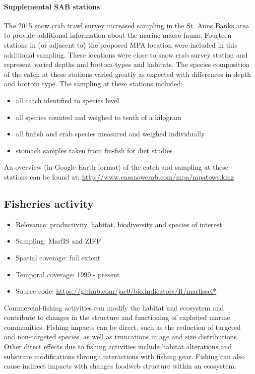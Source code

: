 \documentclass[letterpaper,portrait,11pt]{scrartcl}
\numberwithin{equation}{section}		%
\numberwithin{figure}{section}		%
\numberwithin{table}{section}				%
\begin{document}
\paragraph{Supplemental SAB stations}

The 2015 snow crab trawl survey increased sampling in the St. Anns Banks area to provide additional information about the marine macro-fauna. Fourteen stations in (or adjacent to) the proposed MPA location were included in this additional sampling. These locations were close to snow crab survey station and represent varied depths and bottom-types and habitats. The species composition of the catch at these stations varied greatly as expected with differences in depth and bottom type. The sampling at these stations included:

\begin{itemize}
  \item all catch identified to species level
  \item all species counted and weighed to tenth of a kilogram
  \item all finfish and crab species measured and weighed individually
  \item stomach samples taken from fin-fish for diet studies
\end{itemize}

An overview (in Google Earth format) of the catch and sampling at these stations can be found at: \url{http://www.enssnowcrab.com/mpa/mpatows.kmz}


\subsection{Fisheries activity}


\begin{itemize}
	\item Relevance:  productivity, habitat, biodiversity and species of interest
	\item Sampling:  MarfIS and ZIFF
	\item Spatial coverage: full extent 
	\item Temporal coverage: 1999 - present
	\item Source code: \url{https://github.com/jae0/bio.indicators/R/marfissci*}
\end{itemize}	



Commercial-fishing activities can modify the habitat and ecosystem and contribute to changes in the structure and functioning of exploited marine communities.  Fishing impacts can be direct, such as the reduction of targeted and non-targeted species, as well as truncations in age and size distributions.  Other direct effects due to fishing activities include habitat alterations and substrate modifications through interactions with fishing gear. Fishing can also cause indirect impacts with changes foodweb structure within an ecosystem.  
\end{document}
